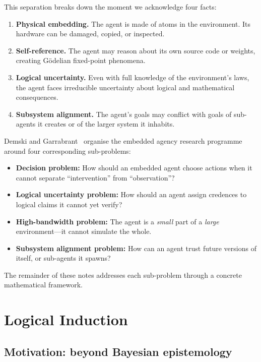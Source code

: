 \documentclass[11pt,a4paper]{article}
\theoremstyle{definition}
\theoremstyle{remark}
\begin{document}
This separation breaks down the moment we acknowledge four facts:
\begin{enumerate}[label=(\roman*)]
  \item \textbf{Physical embedding.} The agent is made of atoms in the
    environment.  Its hardware can be damaged, copied, or inspected.
  \item \textbf{Self-reference.} The agent may reason about its own
    source code or weights, creating G\"odelian fixed-point phenomena.
  \item \textbf{Logical uncertainty.} Even with full knowledge of the
    environment's laws, the agent faces irreducible uncertainty about
    logical and mathematical consequences.
  \item \textbf{Subsystem alignment.} The agent's goals may conflict
    with goals of sub-agents it creates or of the larger system it
    inhabits.
\end{enumerate}

Demski and Garrabrant~\cite{demski2019embedded} organise the embedded
agency research programme around four corresponding sub-problems:
\begin{itemize}
  \item \textbf{Decision problem:} How should an embedded agent choose
    actions when it cannot separate ``intervention'' from ``observation''?
  \item \textbf{Logical uncertainty problem:} How should an agent assign
    credences to logical claims it cannot yet verify?
  \item \textbf{High-bandwidth problem:} The agent is a \emph{small}
    part of a \emph{large} environment---it cannot simulate the whole.
  \item \textbf{Subsystem alignment problem:} How can an agent trust
    future versions of itself, or sub-agents it spawns?
\end{itemize}

The remainder of these notes addresses each sub-problem through a
concrete mathematical framework.

\section{Logical Induction}\label{sec:logical-induction}

\subsection{Motivation: beyond Bayesian epistemology}
\end{document}
